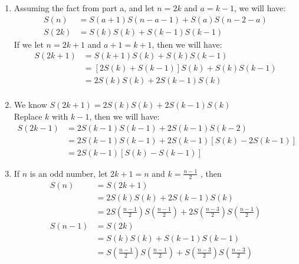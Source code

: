 \documentclass{article}
\begin{document}
\begin{enumerate} [label=(\alph*)]
\item 
Assuming the fact from part a, and let $n=2k$ and $a=k-1$, we will have: \\
\begin{align*} 
S(n) & = S(a+1)S(n-a-1) + S(a)S(n-2-a)\\
S(2k) &= S(k)S(k) + S(k-1)S(k-1) 
\end{align*} 
If we let $n=2k+1$ and $a+1=k+1$, then we will have: 
\begin{align*} 
S(2k+1) & = S(k+1)S(k) + S(k)S(k-1) \\
	& =[2S(k)+S(k-1)]S(k) + S(k)S(k-1)  \\
	& = 2S(k)S(k) + 2S(k-1)S(k)  \\
\end{align*} 
\item 
We know  $ S(2k+1)= 2S(k)S(k) + 2S(k-1)S(k) $ \\
Replace $k$ with $k-1$, then we will have: 
\begin{align*} 
S(2k-1) & =2S(k-1)S(k-1)+2S(k-1)S(k-2)  \\
	    & = 2S(k-1)S(k-1) +2S(k-1)[S(k) -2S(k-1)] \\
	    & = 2S(k-1)[S(k)-S(k-1) ]	 	
\end{align*} 
\item 
If $n$ is an odd number,  let $2k+1=n$  and $k=\frac{n-1}{2}$ , then 
\begin{align*} 
S(n) &= S(2k+1)  \\ 
	&= 2S(k)S(k) + 2S(k-1)S(k) \\
	& = 2S(\frac{n-1}{2})S(\frac{n-1}{2}) + 2S(\frac{n-3}{2})S(\frac{n-1}{2}) \\
S(n-1)  & = S(2k) \\
 	& = S(k)S(k) + S(k-1)S(k-1) \\
	& = S(\frac{n-1}{2})S(\frac{n-1}{2}) + S(\frac{n-3}{2})S(\frac{n-3}{2}) 
\end{align*}


\end{enumerate}
\end{document}
